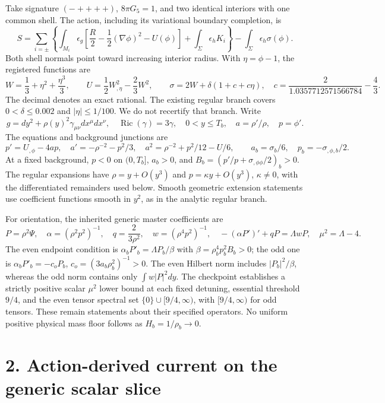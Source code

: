 \documentclass[
  11pt,
]{article}
\begin{document}
Take signature \((-++++)\), \(8\pi G_5=1\), and two identical interiors
with one common shell. The action, including its variational boundary
completion, is \[
 S=\sum_{i=\pm}\left\{\int_{M_i}\!\epsilon_g
 \left[\frac R2-\frac12(\nabla\phi)^2-U(\phi)\right]
 +\int_\Sigma\!\epsilon_h K_i\right\}
 -\int_\Sigma\!\epsilon_h\sigma(\phi).                 \tag{1}
\] Both shell normals point toward increasing interior radius. With
\(\eta=\phi-1\), the registered functions are \[
 W=\frac13+\eta^2+\frac{\eta^3}{3},\qquad
 U=\frac12W_{,\eta}^2-\frac23W^2,\qquad
 \sigma=2W+\delta(1+c+c\eta),\quad
 c=\frac2{1.0357712571566784}-\frac43 .                 \tag{2}
\] The decimal denotes an exact rational. The existing regular branch
covers \(0<\delta\le0.002\) and \(|\eta|\le1/100\). We do not recertify
that branch. Write \[
 g=dy^2+\rho(y)^2\gamma_{\mu\nu}dx^\mu dx^\nu,
 \quad \operatorname{Ric}(\gamma)=3\gamma,
 \quad 0<y\le T_b,\quad a=\rho'/\rho,\quad p=\phi'.
\] The equations and background junctions are \[
 p'=U_{,\phi}-4ap,\quad a'=-\rho^{-2}-p^2/3,\quad
 a^2=\rho^{-2}+p^2/12-U/6,\qquad
 a_b=\sigma_b/6,\quad p_b=-\sigma_{,\phi,b}/2.          \tag{3}
\] At a fixed background, \(p<0\) on \((0,T_b]\), \(a_b>0\), and
\(B_b=(p'/p+\sigma_{,\phi\phi}/2)_b>0\). The regular expansions have
\(\rho=y+O(y^3)\) and \(p=\kappa y+O(y^3)\), \(\kappa\ne0\), with the
differentiated remainders used below. Smooth geometric extension
statements use coefficient functions smooth in \(y^2\), as in the
analytic regular branch.

For orientation, the inherited generic master coefficients are \[
 P=\rho^2\Psi,\quad \alpha=(\rho^2p^2)^{-1},\quad
 q=\frac2{3\rho^2},\quad w=(\rho^4p^2)^{-1},\quad
 -(\alpha P')'+qP=\Lambda wP,\quad \mu^2=\Lambda-4.
                                                               \tag{4}
\] The even endpoint condition is \(\alpha_bP'_b=\Lambda P_b/\beta\)
with \(\beta=\rho_b^4p_b^2B_b>0\); the odd one is
\(\alpha_bP'_b=-c_oP_b\), \(c_o=(3a_b\rho_b^2)^{-1}>0\). The even
Hilbert norm includes \(|P_b|^2/\beta\), whereas the odd norm contains
only \(\int w|P|^2dy\). The checkpoint establishes a strictly positive
scalar \(\mu^2\) lower bound at each fixed detuning, essential threshold
\(9/4\), and the even tensor spectral set \(\{0\}\cup[9/4,\infty)\),
with \([9/4,\infty)\) for odd tensors. These remain statements about
their specified operators. No uniform positive physical mass floor
follows as \(H_b=1/\rho_b\to0\).

\section{2. Action-derived current on the generic scalar
slice}\label{action-derived-current-on-the-generic-scalar-slice}
\end{document}
